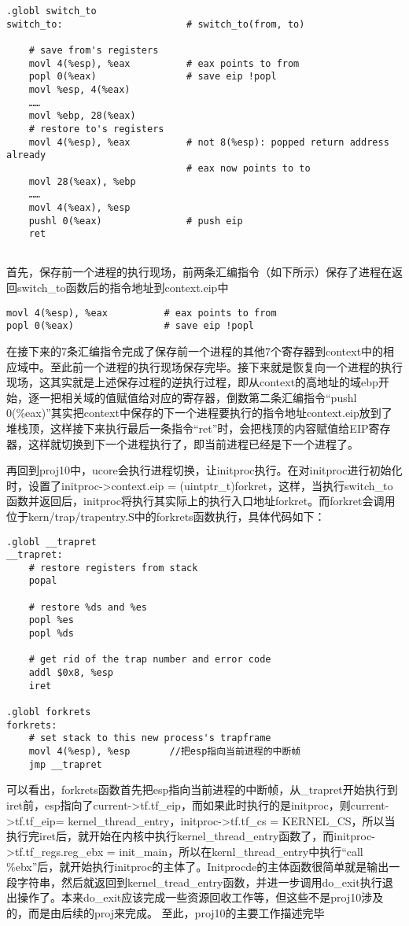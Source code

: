 \begin{lstlisting}
.globl switch_to
switch_to:                      # switch_to(from, to)

    # save from's registers
    movl 4(%esp), %eax          # eax points to from
    popl 0(%eax)                # save eip !popl
    movl %esp, 4(%eax)
    ……
    movl %ebp, 28(%eax)
    # restore to's registers
    movl 4(%esp), %eax          # not 8(%esp): popped return address already
                                # eax now points to to
    movl 28(%eax), %ebp
    ……
    movl 4(%eax), %esp
    pushl 0(%eax)               # push eip
    ret
  
\end{lstlisting}

首先，保存前一个进程的执行现场，前两条汇编指令（如下所示）保存了进程在返回switch\_to函数后的指令地址到context.eip中

\begin{lstlisting}
movl 4(%esp), %eax          # eax points to from
popl 0(%eax)                # save eip !popl
\end{lstlisting}

在接下来的7条汇编指令完成了保存前一个进程的其他7个寄存器到context中的相应域中。至此前一个进程的执行现场保存完毕。接下来就是恢复向一个进程的执行现场，这其实就是上述保存过程的逆执行过程，即从context的高地址的域ebp开始，逐一把相关域的值赋值给对应的寄存器，倒数第二条汇编指令``pushl
0(\%eax)''其实把context中保存的下一个进程要执行的指令地址context.eip放到了堆栈顶，这样接下来执行最后一条指令``ret''时，会把栈顶的内容赋值给EIP寄存器，这样就切换到下一个进程执行了，即当前进程已经是下一个进程了。

再回到proj10中，ucore会执行进程切换，让initproc执行。在对initproc进行初始化时，设置了initproc-\textgreater{}context.eip
=
(uintptr\_t)forkret，这样，当执行switch\_to函数并返回后，initproc将执行其实际上的执行入口地址forkret。而forkret会调用位于kern/trap/trapentry.S中的forkrets函数执行，具体代码如下：

\begin{lstlisting}
.globl __trapret
__trapret:
    # restore registers from stack
    popal

    # restore %ds and %es
    popl %es
    popl %ds

    # get rid of the trap number and error code
    addl $0x8, %esp
    iret

.globl forkrets
forkrets:
    # set stack to this new process's trapframe
    movl 4(%esp), %esp       //把esp指向当前进程的中断帧
    jmp __trapret
\end{lstlisting}

可以看出，forkrets函数首先把esp指向当前进程的中断帧，从\_trapret开始执行到iret前，esp指向了current-\textgreater{}tf.tf\_eip，而如果此时执行的是initproc，则current-\textgreater{}tf.tf\_eip=
kernel\_thread\_entry，initproc-\textgreater{}tf.tf\_cs =
KERNEL\_CS，所以当执行完iret后，就开始在内核中执行kernel\_thread\_entry函数了，而initproc-\textgreater{}tf.tf\_regs.reg\_ebx
= init\_main，所以在kernl\_thread\_entry中执行``call
\%ebx''后，就开始执行initproc的主体了。Initprocde的主体函数很简单就是输出一段字符串，然后就返回到kernel\_tread\_entry函数，并进一步调用do\_exit执行退出操作了。本来do\_exit应该完成一些资源回收工作等，但这些不是proj10涉及的，而是由后续的proj来完成。
至此，proj10的主要工作描述完毕
